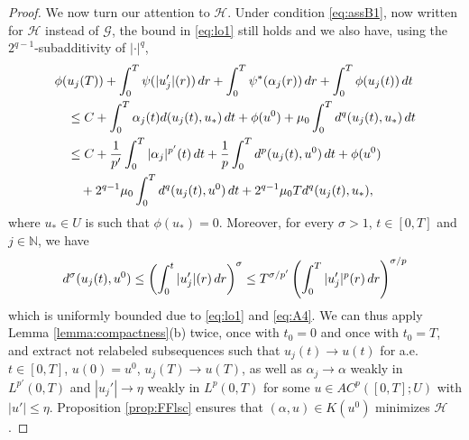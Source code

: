 \documentclass[10pt,a4paper]{amsart}
\newcommand{\Nz}{\mathbb{N}}
\newcommand{\dr}{{\rm d} r}
\newcommand{\GG}{{\mathcal G}}
\newcommand{\HH}{{\mathcal H}}
\renewcommand{\d}{{\rm d}}
\begin{document}
\begin{proof}
We now turn our attention to $\HH$. Under condition
  \eqref{eq:assB1}, now written for $\HH$ instead of $\GG$,  the bound in \eqref{eq:lo1} still holds and we also have, using the $2^{q-1}$-subadditivity  of  $|\cdot|^q$,  
 \begin{align*}
  &\phi(u_j(T)) +  \int_0^T \psi(|u_j'| (r))\, \dr +  \int_0^T
  \psi^*(\alpha_j(r))\, \dr + \int_0^T \phi(u_j(t))\, \d t \\
  &\quad \leq  C  +\int_0^T \alpha_j(t) d (u_j(t),u_*)\, \d t +
\phi(u^0)  +  \mu_0  \int_0^T d^q(u_j(t), u_*)\, \d t \\
& \quad  \le C+ \frac{1}{p'}\int_0^T|\alpha_j|^{p'}(t)\, \d t+ \frac1p\int_0^T
     d^p(u_j(t),u^0) \, \d t + \phi(u^0)\\
     &\qquad +  { 2^{q-1} \mu_0 } \int_0^T d^q(u_j(t),
       u^0) \, \d t + { 2^{q-1} \mu_0   T} d^q(u_j(t), u_*),
 \end{align*}
 where $u_* \in U$ is such that $\phi(u_*)=0$. Moreover, for every $\sigma>1$, $t \in [0,T]$ and $j \in \Nz$, we have
\[
d^\sigma(u_j(t), u^0) \le \left ( \int_0^t |u_j'|(r) \, \d r \right )^\sigma \le T^{\sigma/p'}\left ( \int_0^T |u_j'|^p(r) \, \d r \right )^{\sigma/p} 
\]
which is uniformly bounded due to \eqref{eq:lo1} and \eqref{eq:A4}. We can thus apply Lemma \ref{lemma:compactness}(b) twice, once with $t_0=0$ and once with $t_0=T$, and extract not relabeled subsequences such that $u_j (t) \to u(t)$ for
a.e. $t \in [0,T]$, $u(0)=u^0$, $u_j(T) \to u(T)$, as well as  $\alpha_j \to \alpha$ weakly in
$L^{p'}(0,T)$ and $|u_j'|\to \eta$ weakly in $L^p(0,T)$ for some $u \in AC^p([0,T];U)$ with $|u'| \le \eta$.  Proposition \ref{prop:FFlsc} ensures that
$(\alpha,u)\in K(u^0)$ minimizes $\HH $.  
\end{proof}
\end{document}
